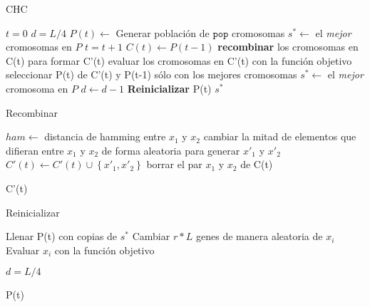 \begin{algorithm}
\caption{CHC}
\label{chc}
\begin{algorithmic}[1]


\State $t=0$
\State $d=L/4$
\State $P(t) \gets$ Generar población de $\texttt{pop}$ cromosomas
\State $s^* \gets $ el \emph{mejor} cromosomas en $P$
	\State $t=t+1$
	\State $C(t) \gets P(t-1)$
	\State \textbf{recombinar} los cromosomas en C(t) para formar C'(t)
	\State evaluar los cromosomas en C'(t) con la función objetivo
	\State seleccionar P(t) de C'(t) y P(t-1) sólo con los mejores cromosomas
		\State $s^* \gets$ el \emph{mejor} cromosoma en $P$
	\EndIf
		\State $d \gets d - 1$
	\EndIf
		\State \textbf{Reinicializar} P(t)
	\EndIf
\EndWhile
\State \Return $s^*$

\end{algorithmic}
\end{algorithm}

\begin{algorithm}
\caption{Recombinar}
\label{recombinar}
\begin{algorithmic}


	\State $ham \gets$ distancia de hamming entre $x_1$ y $x_2$
		\State cambiar la mitad de elementos que difieran entre $x_1$ y $x_2$ de forma aleatoria para generar $x'_1$ y $x'_2$
		\State $C'(t) \gets C'(t) \cup \left\{x'_1,x'_2\right\}$
	\Else
		\State borrar el par $x_1$ y $x_2$ de C(t)
	\EndIf
\EndFor

\State \Return C'(t)

\end{algorithmic}
\end{algorithm}

\begin{algorithm}
\caption{Reinicializar}
\label{Reinicializar}
\begin{algorithmic}


\State Llenar P(t) con copias de $s^*$
	\State Cambiar $r*L$ genes de manera aleatoria de $x_i$
	\State Evaluar $x_i$ con la función objetivo
\EndFor

\State $d=L/4$

\State \Return P(t)

\end{algorithmic}
\end{algorithm}

